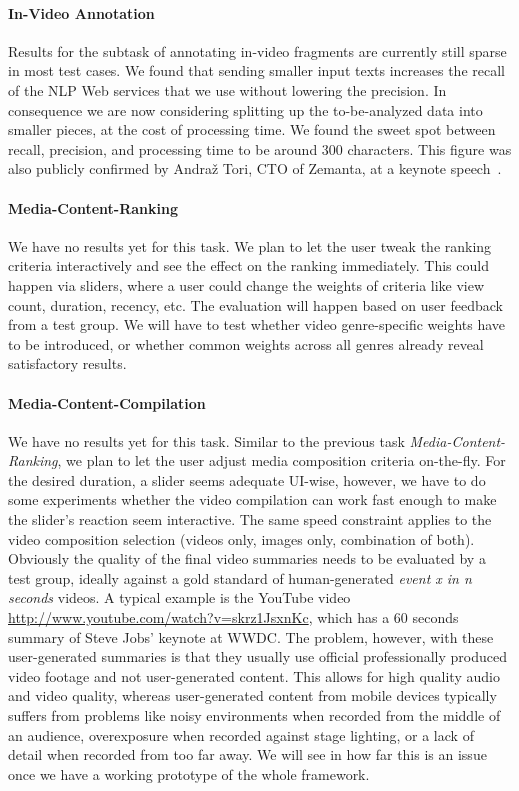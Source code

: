 \documentclass[runningheads,a4paper]{llncs}
\begin{document}
\paragraph{In-Video Annotation}
Results for the subtask of annotating in-video fragments are currently still sparse in most test cases. We found that sending smaller input texts increases the recall of the NLP Web services that we use without lowering the precision. In consequence we are now considering splitting up the to-be-analyzed data into smaller pieces, at the cost of processing time. We found the sweet spot between recall, precision, and processing time to be around 300 characters. This figure was also publicly confirmed by Andra\v{z} Tori, CTO of Zemanta, at a keynote speech~\cite{andraz}.

\paragraph{\bf{Media-Content-Ranking}}
We have no results yet for this task. We plan to let the user tweak the ranking criteria interactively and see the effect on the ranking immediately. This could happen via sliders, where a user could change the weights of criteria like view count, duration, recency, etc. The evaluation will happen based on user feedback from a test group. We will have to test whether video genre-specific weights have to be introduced, or whether common weights across all genres already reveal satisfactory results.

\paragraph{\bf{Media-Content-Compilation}}
We have no results yet for this task. Similar to the previous task \emph{Media-Content-Ranking}, we plan to let the user adjust media composition criteria on-the-fly. For the desired duration, a slider seems adequate UI-wise, however, we have to do some experiments whether the video compilation can work fast enough to make the slider's reaction seem interactive. The same speed constraint applies to the video composition selection (videos only, images only, combination of both). Obviously the quality of the final video summaries needs to be evaluated by a test group, ideally against a gold standard of human-generated \emph{event x in n seconds} videos. A typical example is the YouTube video \url{http://www.youtube.com/watch?v=skrz1JsxnKc}, which has a 60 seconds summary of Steve Jobs' keynote at WWDC. The problem, however, with these user-generated summaries is that they usually use official professionally produced video footage and not user-generated content. This allows for high quality audio and video quality, whereas user-generated content from mobile devices typically suffers from problems like noisy environments when recorded from the middle of an audience, overexposure when recorded against stage lighting, or a lack of detail when recorded from too far away. We will see in how far this is an issue once we have a working prototype of the whole framework.
\end{document}
